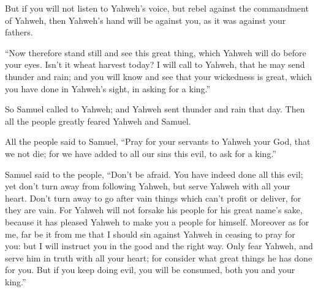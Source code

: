 {But if you will not listen to Yahweh’s voice, but rebel against the commandment of Yahweh, then Yahweh’s hand will be against you, as it was against your fathers.
\par }{\PP {}“Now therefore stand still and see this great thing, which Yahweh will do before your eyes.
Isn’t it wheat harvest today? I will call to Yahweh, that he may send thunder and rain; and you will know and see that your wickedness is great, which you have done in Yahweh’s sight, in asking for a king.”
\par }{\PP {}So Samuel called to Yahweh; and Yahweh sent thunder and rain that day. Then all the people greatly feared Yahweh and Samuel.
\par }{\PP {}All the people said to Samuel, “Pray for your servants to Yahweh your God, that we not die; for we have added to all our sins this evil, to ask for a king.”
\par }{\PP {}Samuel said to the people, “Don’t be afraid. You have indeed done all this evil; yet don’t turn away from following Yahweh, but serve Yahweh with all your heart.
Don’t turn away to go after vain things which can’t profit or deliver, for they are vain.
For Yahweh will not forsake his people for his great name’s sake, because it has pleased Yahweh to make you a people for himself.
Moreover as for me, far be it from me that I should sin against Yahweh in ceasing to pray for you: but I will instruct you in the good and the right way.
Only fear Yahweh, and serve him in truth with all your heart; for consider what great things he has done for you.
But if you keep doing evil, you will be consumed, both you and your king.”

}
